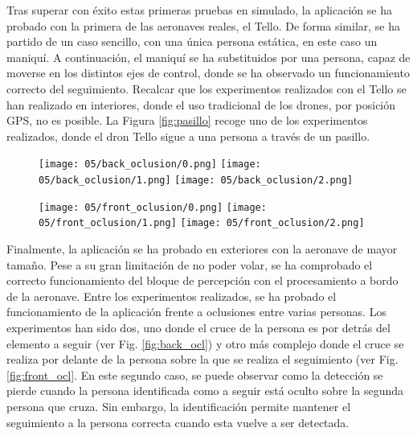 \documentclass[../main.tex]{subfiles}
\begin{document}
\newpage
Tras superar con éxito estas primeras pruebas en simulado, la aplicación se ha probado con la primera de las aeronaves reales, el Tello. De forma similar, se ha partido de un caso sencillo, con una única persona estática, en este caso un maniquí. A continuación, el maniquí se ha substituidos por una persona, capaz de moverse en los distintos ejes de control, donde se ha observado un funcionamiento correcto del seguimiento. Recalcar que los experimentos realizados con el Tello se han realizado en interiores, donde el uso tradicional de los drones, por posición GPS, no es posible. La Figura \ref{fig:pasillo} recoge uno de los experimentos realizados, donde el dron Tello sigue a una persona a través de un pasillo.

\begin{figure}[htp]
 	{\texttt{[image: 05/back\_oclusion/0.png]}\hfill
    \texttt{[image: 05/back\_oclusion/1.png]}\hfill
    \texttt{[image: 05/back\_oclusion/2.png]}}
\end{figure}

\begin{figure}[htp]
 	{\texttt{[image: 05/front\_oclusion/0.png]}\hfill
    \texttt{[image: 05/front\_oclusion/1.png]}\hfill
    \texttt{[image: 05/front\_oclusion/2.png]}}
\end{figure}

Finalmente, la aplicación se ha probado en exteriores con la aeronave de mayor tamaño. Pese a su gran limitación de no poder volar, se ha comprobado el correcto funcionamiento del bloque de percepción con el procesamiento a bordo de la aeronave. Entre los experimentos realizados, se ha probado el funcionamiento de la aplicación frente a oclusiones entre varias personas. Los experimentos han sido dos, uno donde el cruce de la persona es por detrás del elemento a seguir (ver Fig. \ref{fig:back_ocl}) y otro más complejo donde el cruce se realiza por delante de la persona sobre la que se realiza el seguimiento (ver Fig. \ref{fig:front_ocl}. En este segundo caso, se puede observar como la detección se pierde cuando la persona identificada como a seguir está oculto sobre la segunda persona que cruza. Sin embargo, la identificación  permite mantener el seguimiento a la persona correcta cuando esta vuelve a ser detectada.
\end{document}
